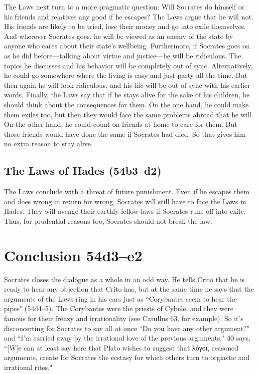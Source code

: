 \documentclass[12pt,letterpaper]{article}
\begin{document}
The Laws next turn to a more pragmatic question: Will Socrates do himself or his friends and relatives any good if he escapes?  The Laws argue that he will not. His friends are likely to be tried, lose their money and go into exile themselves. And wherever Socrates goes, he will be viewed as an enemy of the state by anyone who cares about their state's wellbeing. Furthermore, if Socrates goes on as he did before---talking about virtue and justice---he will be ridiculous. The topics he discusses and his behavior will be completely out of sync. Alternatively, he could go somewhere where the living is easy and just party all the time. But then again he will look ridiculous, and his life will be out of sync with his earlier words. Finally, the Laws say that if he stays alive for the sake of his children, he should think about the consequences for them. On the one hand, he could make them exiles too, but then they would face the same problems abroad that he will. On the other hand, he could count on friends at home to care for them. But those friends would have done the same if Socrates had died. So that gives him no extra reason to stay alive.

\subsection*{The Laws of Hades (54b3--d2)}

The Laws conclude with a threat of future punishment. Even if he escapes them and does wrong in return for wrong, Socrates will still have to face the Laws in Hades. They will avenge their earthly fellow laws if Socrates runs off into exile. Thus, for prudential reasons too, Socrates should not break the law.


\section*{Conclusion 54d3--e2}

Socrates closes the dialogue as a whole in an odd way. He tells Crito that he is ready to hear any objection that Crito has, but at the same time he says that the arguments of the Laws ring in his ears just as ``Corybantes seem to hear the pipes" (54d4--5). The Corybantes were the priests of Cybele, and they were famous for their frenzy and irrationality (see Catullus 63, for example). So it's disconcerting for Socrates to say all at once ``Do you have any other argument?" and ``I'm carried away by the irrational love of the previous arguments." \cite{rose1983} 40 says, ``[W]e can at least say here that Plato wishes to suggest that \textgreek{λόγοι}, reasoned arguments, create for Socrates the ecstasy for which others turn to orgiastic and irrational rites."
\end{document}
